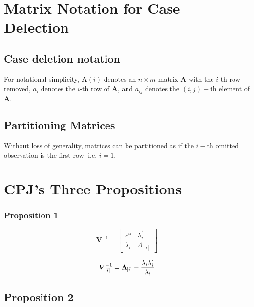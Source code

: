 \documentclass[Main.tex]{subfiles}
\begin{document}

\newpage
\section{Matrix Notation for Case Delection} %

\subsection{Case deletion notation} %

For notational simplicity, $\boldsymbol{A}(i)$ denotes an $n \times m$ matrix $\boldsymbol{A}$ with the $i$-th row
removed, $a_i$ denotes the $i$-th row of $\boldsymbol{A}$, and $a_{ij}$ denotes the $(i, j)-$th element of $\boldsymbol{A}$.

\subsection{Partitioning Matrices} %
Without loss of generality, matrices can be partitioned as if the $i-$th omitted observation is the first row; i.e. $i=1$.

\newpage
\section{CPJ's Three Propositions} %


\subsubsection{Proposition 1}

\[
\boldsymbol{V}^{-1} =
\left[ \begin{array}{cc}
\nu^{ii} & \lambda_{i}^{\prime}  \\
\lambda_{i} & \Lambda_{[i]}
\end{array}\right] \]


\[\boldsymbol{V}_{[i]}^{-1} = \boldsymbol{\Lambda}_{[i]} - { \lambda_{i} \lambda_{i} ^{\prime} \over \lambda_{i} } \]

\subsection{Proposition 2}
\end{document}
